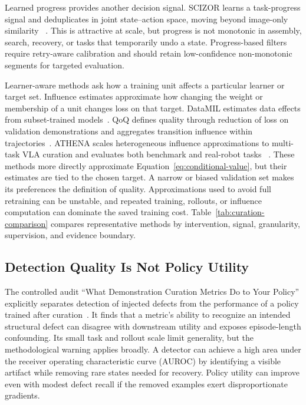 Learned progress provides another decision signal.
SCIZOR learns a task-progress signal and deduplicates in joint state--action space, moving beyond image-only similarity ~\cite{zhang2025scizor_2505_22626}.
This is attractive at scale, but progress is not monotonic in assembly, search, recovery, or tasks that temporarily undo a state.
Progress-based filters require retry-aware calibration and should retain low-confidence non-monotonic segments for targeted evaluation.

Learner-aware methods ask how a training unit affects a particular learner or target set.
Influence estimates approximate how changing the weight or membership of a unit changes loss on that target.
DataMIL estimates data effects from subset-trained models~\cite{dass2025datamil_2505_09603}.
QoQ defines quality through reduction of loss on validation demonstrations and aggregates transition influence within trajectories~\cite{lee2026quality_2603_09056}.
ATHENA scales heterogeneous influence approximations to multi-task VLA curation and evaluates both benchmark and real-robot tasks ~\cite{xu2026athena_2606_16208}.
These methods more directly approximate Equation~\ref{eq:conditional-value}, but their estimates are tied to the chosen target.
A narrow or biased validation set makes its preferences the definition of quality.
Approximations used to avoid full retraining can be unstable, and repeated training, rollouts, or influence computation can dominate the saved training cost.
Table~\ref{tab:curation-comparison} compares representative methods by intervention, signal, granularity, supervision, and evidence boundary.



\subsection{Detection Quality Is Not Policy Utility}

The controlled audit ``What Demonstration Curation Metrics Do to Your Policy'' explicitly separates detection of injected defects from the performance of a policy trained after curation~\cite{bedi2026what_2606_10229}.
It finds that a metric's ability to recognize an intended structural defect can disagree with downstream utility and exposes episode-length confounding.
Its small task and rollout scale limit generality, but the methodological warning applies broadly.
A detector can achieve a high area under the receiver operating characteristic curve (AUROC) by identifying a visible artifact while removing rare states needed for recovery.
Policy utility can improve even with modest defect recall if the removed examples exert disproportionate gradients.

